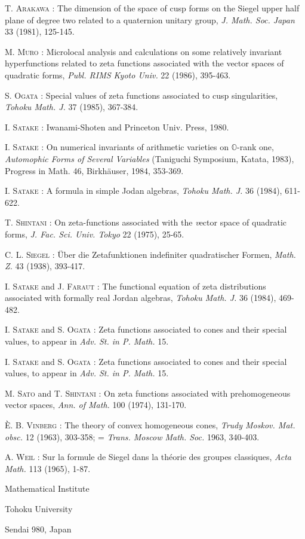 \begin{thebibliography}{99}
 \textsc{T. Arakawa :} The dimension of the space of cusp forms on the Siegel upper half plane of degree two related to a quaternion unitary group, {\em J. Math. Soc. Japan} 33 (1981), 125-145.

 \textsc{M. Muro :} Microlocal analysis and calculations on some relatively invariant hyperfunctions related to zeta functions associated with the vector spaces of quadratic forms, {\em Publ. RIMS Kyoto Univ.} 22 (1986), 395-463.

 \textsc{S. Ogata :} Special values of zeta functions associated to cusp singularities, {\em Tohoku Math. J.} 37 (1985), 367-384.

 \textsc{I. Satake :} Iwanami-Shoten and Princeton Univ. Press, 1980.

 \textsc{I. Satake :} On numerical invariants of arithmetic varieties on $\mathbb{O}$-rank one, {\em Automophic Forms of Several Variables} (Taniguchi Symposium, Katata, 1983), Progress in Math. 46, Birkh\"auser, 1984, 353-369.

 \textsc{I. Satake :} A formula in simple Jodan algebras, {\em Tohoku Math. J.} 36 (1984), 611-622.

 \textsc{T. Shintani :} On zeta-functions associated with the {\em v}ector space of quadratic forms, {\em J. Fac. Sci. Univ. Tokyo} 22 (1975), 25-65.

 \textsc{C. L. Siegel :} \"Uber die Zetafunktionen indefiniter quadratischer Formen, {\em Math. Z.} 43 (1938), 393-417.

 \textsc{I. Satake} and \textsc{J. Faraut :} The functional equation of zeta distributions associated with formally real Jordan algebras, {\em Tohoku Math. J.} 36 (1984), 469-482.

 \textsc{I. Satake} and \textsc{S. Ogata :} Zeta functions associated to cones and their special values, to appear in {\em Adv. St. in P. Math.} 15.

 \textsc{I. Satake} and \textsc{S. Ogata :} Zeta functions associated to cones and their special values, to appear in {\em Adv. St. in P. Math.} 15.

 \textsc{M. Sato} and \textsc{T. Shintani :} On zeta functions associated with prehomogeneous vector spaces, {\em Ann. of Math.} 100 (1974), 131-170.

 \textsc{\`E. B. Vinberg :} The theory of convex homogeneous cones, {\em Trudy Moskov. Mat. obsc.} 12 (1963), 303-358; = {\em Trans. Moscow Math. Soc.} 1963, 340-403.

 \textsc{A. Weil :} Sur la formule de Siegel dans la th\'eorie des groupes classiques, {\em Acta Math.} 113 (1965), 1-87.
\end{thebibliography}

\bigskip
\noindent
{\small Mathematical Institute}

\noindent
{\small Tohoku University}

\noindent
{\small Sendai 980, Japan}
